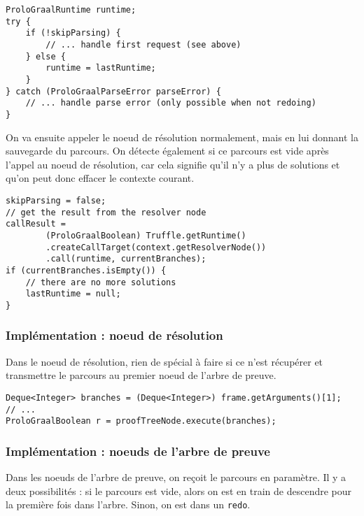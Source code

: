 \documentclass[../report.tex]{subfiles}
\begin{document}
\begin{verbatim}
ProloGraalRuntime runtime;
try {
    if (!skipParsing) {
        // ... handle first request (see above)
    } else {
        runtime = lastRuntime;
    }
} catch (ProloGraalParseError parseError) {
    // ... handle parse error (only possible when not redoing)
}
\end{verbatim}
On va ensuite appeler le noeud de résolution normalement, mais en lui donnant la sauvegarde du parcours. On détecte également si ce parcours est vide après l'appel au noeud de résolution, car cela signifie qu'il n'y a plus de solutions et qu'on peut donc effacer le contexte courant.
\begin{verbatim}
skipParsing = false;
// get the result from the resolver node
callResult =
        (ProloGraalBoolean) Truffle.getRuntime()
        .createCallTarget(context.getResolverNode())
        .call(runtime, currentBranches);
if (currentBranches.isEmpty()) {
    // there are no more solutions
    lastRuntime = null;
}
\end{verbatim}
\subsubsection{Implémentation : noeud de résolution}
Dans le noeud de résolution, rien de spécial à faire si ce n'est récupérer et transmettre le parcours au premier noeud de l'arbre de preuve.
\begin{verbatim}
Deque<Integer> branches = (Deque<Integer>) frame.getArguments()[1];
// ...
ProloGraalBoolean r = proofTreeNode.execute(branches);
\end{verbatim}
\subsubsection{Implémentation : noeuds de l'arbre de preuve}\label{subsubsec:bonusphasetreenodes}
Dans les noeuds de l'arbre de preuve, on reçoit le parcours en paramètre. Il y a deux possibilités : si le parcours est vide, alors on est en train de descendre pour la première fois dans l'arbre. Sinon, on est dans un \texttt{redo}.
\end{document}
